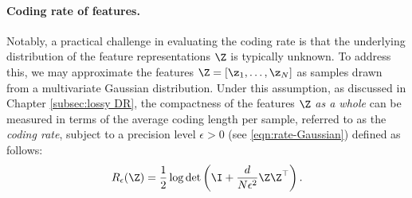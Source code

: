 \documentclass[../../book-main.tex]{subfiles}
\begin{document}
\paragraph{Coding rate of features.} Notably, a practical challenge in evaluating the coding rate is that the underlying distribution of the feature representations $\Z$ is typically unknown. To address this, we may approximate the features $\Z = [\z_1, \ldots, \z_N]$ as samples drawn from a multivariate Gaussian distribution. Under this assumption, as discussed in Chapter \ref{subsec:lossy DR}, the compactness of the features $\Z$ {\em as a whole} can be measured in terms of the average coding length per sample,  referred to as the {\em coding rate}, subject to a precision level $\epsilon > 0$ (see \eqref{eqn:rate-Gaussian}) defined as follows:
\begin{equation}
	R_{\epsilon}(\Z) = \frac{1}{2}\log\det\left(\I + \frac{d}{N\epsilon^{2}}\Z\Z^{\top}\right).
	\label{chap4-eqn:coding-length-eval}
\end{equation}
\end{document}
